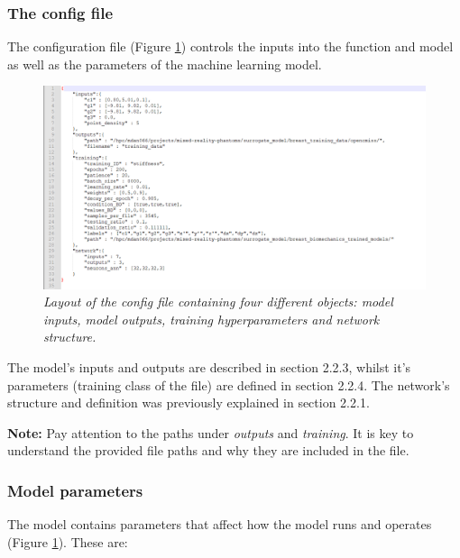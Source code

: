 \documentclass[11pt]{article}
\begin{document}
\subsubsection{The config file}
The configuration file (Figure \ref{fig2}) controls the inputs into the function and model as well as the parameters of the machine learning model.

\begin{figure}[H]
    \centering
    \includegraphics[scale=1.1]{Images/breast/machine_learning/breast_opencmiss_config.png}
    \caption{\textit{\label{fig2}Layout of the config file containing four different objects: model inputs, model outputs, training hyperparameters and network structure.}}
\end{figure}

The model's inputs and outputs are described in section 2.2.3, whilst it's parameters (training class of the file) are defined in section 2.2.4. The network's structure and definition was previously explained in section 2.2.1. 

\textbf{Note:} Pay attention to the paths under \textit{outputs} and \textit{training}. It is key to understand the provided file paths and why they are included in the file. 

\subsubsection{Model parameters}
The model contains parameters that affect how the model runs and
operates (Figure \ref{fig2}). These are:
\end{document}
